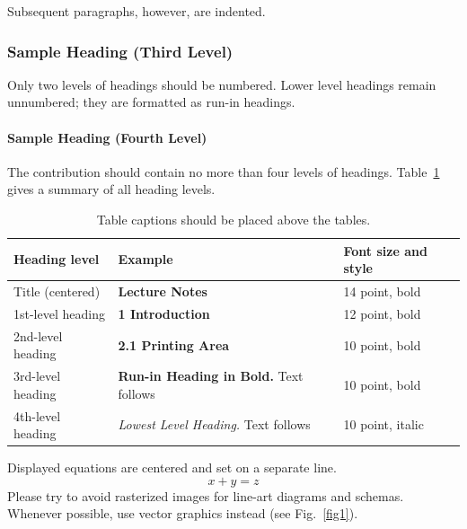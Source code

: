 \documentclass[runningheads]{llncs}
\begin{document}
Subsequent paragraphs, however, are indented.

\subsubsection{Sample Heading (Third Level)} Only two levels of
headings should be numbered. Lower level headings remain unnumbered;
they are formatted as run-in headings.

\paragraph{Sample Heading (Fourth Level)}
The contribution should contain no more than four levels of
headings. Table~\ref{tab1} gives a summary of all heading levels.

\begin{table}
    \caption{Table captions should be placed above the
        tables.}\label{tab1}
    \begin{tabular}{|l|l|l|}
        \hline
        Heading level     & Example                                          & Font size and style \\
        \hline
        Title (centered)  & {\Large\bfseries Lecture Notes}                  & 14 point, bold      \\
        1st-level heading & {\large\bfseries 1 Introduction}                 & 12 point, bold      \\
        2nd-level heading & {\bfseries 2.1 Printing Area}                    & 10 point, bold      \\
        3rd-level heading & {\bfseries Run-in Heading in Bold.} Text follows & 10 point, bold      \\
        4th-level heading & {\itshape Lowest Level Heading.} Text follows    & 10 point, italic    \\
        \hline
    \end{tabular}
\end{table}


\noindent Displayed equations are centered and set on a separate
line.
\begin{equation}
    x + y = z
\end{equation}
Please try to avoid rasterized images for line-art diagrams and
schemas. Whenever possible, use vector graphics instead (see
Fig.~\ref{fig1}).
\end{document}
